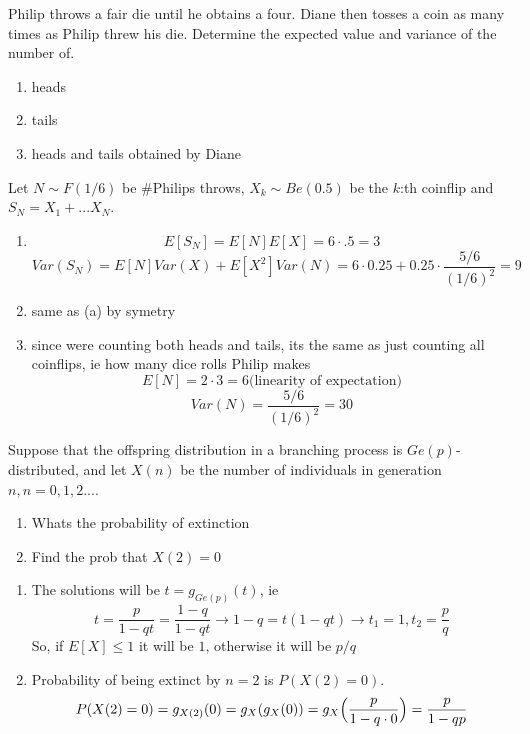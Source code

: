 \begin{enumerate}[label=(\alph*)]
\problem

\problem 
Philip throws a fair die until he obtains a four.
 Diane then tosses a coin as many times as Philip
  threw his die. Determine the expected value and variance of the number of.
\begin{enumerate}
    \item heads
    \item tails
    \item heads and tails obtained by Diane
\end{enumerate}
\solution
Let $N \sim F(1/6)$ be $\#$Philips throws, $X_k \sim Be(0.5)$ be the $k$:th coinflip and $S_N = X_1 + ... X_N$.
\begin{enumerate}
    \item \[
        E[S_N] = E[N]E[X] = 6\cdot.5 = 3
    \]
    \[
        Var(S_N) = E[N]Var(X) + E[X^2]Var(N) = 6\cdot0.25 + 0.25\cdot\frac{5/6}{(1/6)^2} =9
        \]
    \item same as (a) by symetry
    \item since were counting both heads and tails, its the same as just counting all coinflips, ie how many dice rolls Philip makes
    \[
      E[N] = 2\cdot3 = 6\text{(linearity of expectation)} \]
       \[
      Var(N) = \frac{5/6}{(1/6)^2}  = 30
    \]
\end{enumerate}
\setcounter{problem}{34}

\problem
Suppose that the offspring distribution in a branching process is $Ge(p)$-distributed, and let $X(n)$ be the number of individuals in generation $n, n=0,1,2...$.

\begin{enumerate}
    \item Whats the probability of extinction
    \item Find the prob that $X(2) = 0$
\end{enumerate}

\solution

\begin{enumerate}
    \item The solutions will be $t=g_{Ge(p)}(t)$, ie \[
    t = \frac{p}{1-qt} = \frac{1-q}{1-qt} \rightarrow 1-q = t(1-qt) \rightarrow t_1 = 1, t_2 = \frac{p}{q}    
    \] So, if $E[X] \leq 1$ it will be $1$, otherwise it will be $p/q$
    \item Probability of being extinct by $n=2$ is $P(X(2) = 0)$. \[
        P(X(2) = 0) = g_{X(2)}(0) = g_X(g_X(0)) = g_X\Bigl(\frac{p}{1-q \cdot 0}\Bigr) = \frac{p}{1-qp}
    \]
\end{enumerate}
\problem


\end{enumerate}
